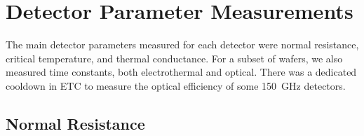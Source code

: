 \section{Detector Parameter Measurements}
\label{sec:parameter_measurements}

The main detector parameters measured for each detector were normal resistance, critical temperature, and thermal conductance. 
For a subset of wafers, we also measured time constants, both electrothermal and optical. 
There was a dedicated cooldown in \ac{ETC} to measure the optical efficiency of some 150~GHz detectors. 

\subsection{Normal Resistance}
\label{sec:normal_resistance}







